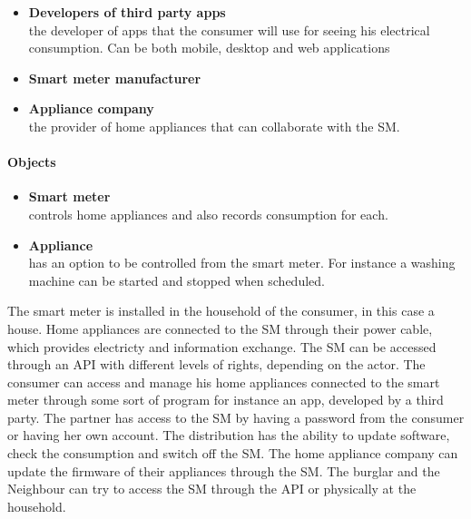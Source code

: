 \begin{itemize}
\item \textbf{Developers of third party apps}\\
the developer of apps that the consumer will use for seeing his electrical consumption. Can be both mobile, desktop and web applications
\item \textbf{Smart meter manufacturer}\\
\item \textbf{Appliance company}\\ the provider of home appliances that can collaborate with the SM.
\end{itemize}

\paragraph{Objects}
\begin{itemize}
\item \textbf{Smart meter}\\ controls home appliances and also records consumption for each.
\item \textbf{Appliance}\\ has an option to be controlled from the smart meter. For instance a washing machine can be started and stopped when scheduled.
\end{itemize}

The smart meter is installed in the household of the consumer, in this case a house.
Home appliances are connected to the SM through their power cable, which provides electricty and information exchange.
The SM can be accessed through an API with different levels of rights, depending on the actor.
The consumer can access and manage his home appliances connected to the smart meter through some sort of program for instance an app, developed by a third party.
The partner has access to the SM by having a password from the consumer or having her own account.
The distribution has the ability to update software, check the consumption and switch off the SM.
The home appliance company can update the firmware of their appliances through the SM.
The burglar and the Neighbour can try to access the SM through the API or physically at the household.

